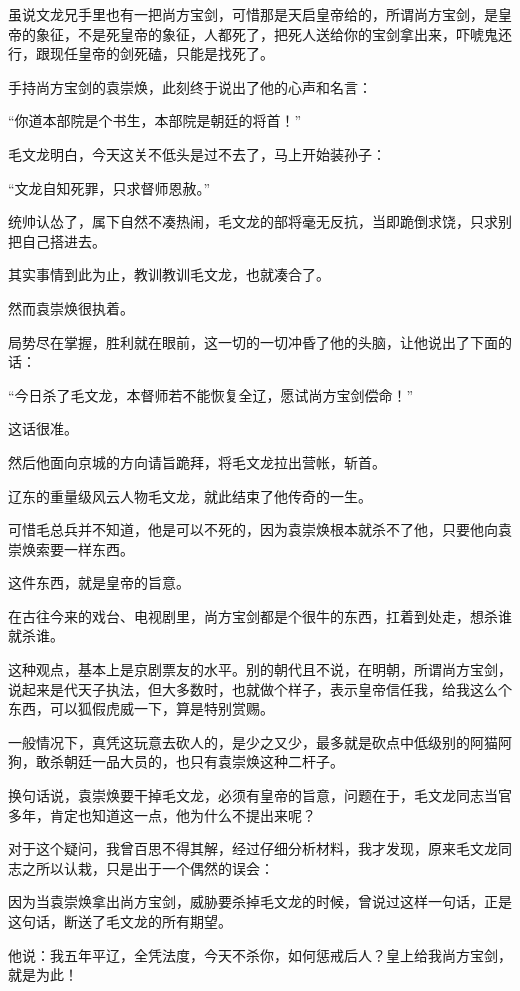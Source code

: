 \begin{multicols}{\theparacolNo}
		虽说文龙兄手里也有一把尚方宝剑，可惜那是天启皇帝给的，所谓尚方宝剑，是皇帝的象征，不是死皇帝的象征，人都死了，把死人送给你的宝剑拿出来，吓唬鬼还行，跟现任皇帝的剑死磕，只能是找死了。

		手持尚方宝剑的袁崇焕，此刻终于说出了他的心声和名言：

		“你道本部院是个书生，本部院是朝廷的将首！”

		毛文龙明白，今天这关不低头是过不去了，马上开始装孙子：

		“文龙自知死罪，只求督师恩赦。”

		统帅认怂了，属下自然不凑热闹，毛文龙的部将毫无反抗，当即跪倒求饶，只求别把自己搭进去。

		其实事情到此为止，教训教训毛文龙，也就凑合了。

		然而袁崇焕很执着。

		局势尽在掌握，胜利就在眼前，这一切的一切冲昏了他的头脑，让他说出了下面的话：

		“今日杀了毛文龙，本督师若不能恢复全辽，愿试尚方宝剑偿命！”

		这话很准。

		然后他面向京城的方向请旨跪拜，将毛文龙拉出营帐，斩首。

		辽东的重量级风云人物毛文龙，就此结束了他传奇的一生。

		可惜毛总兵并不知道，他是可以不死的，因为袁崇焕根本就杀不了他，只要他向袁崇焕索要一样东西。

		这件东西，就是皇帝的旨意。

		在古往今来的戏台、电视剧里，尚方宝剑都是个很牛的东西，扛着到处走，想杀谁就杀谁。

		这种观点，基本上是京剧票友的水平。别的朝代且不说，在明朝，所谓尚方宝剑，说起来是代天子执法，但大多数时，也就做个样子，表示皇帝信任我，给我这么个东西，可以狐假虎威一下，算是特别赏赐。

		一般情况下，真凭这玩意去砍人的，是少之又少，最多就是砍点中低级别的阿猫阿狗，敢杀朝廷一品大员的，也只有袁崇焕这种二杆子。

		换句话说，袁崇焕要干掉毛文龙，必须有皇帝的旨意，问题在于，毛文龙同志当官多年，肯定也知道这一点，他为什么不提出来呢？

		对于这个疑问，我曾百思不得其解，经过仔细分析材料，我才发现，原来毛文龙同志之所以认栽，只是出于一个偶然的误会：

		因为当袁崇焕拿出尚方宝剑，威胁要杀掉毛文龙的时候，曾说过这样一句话，正是这句话，断送了毛文龙的所有期望。

		他说：我五年平辽，全凭法度，今天不杀你，如何惩戒后人？皇上给我尚方宝剑，就是为此！


\end{multicols}
